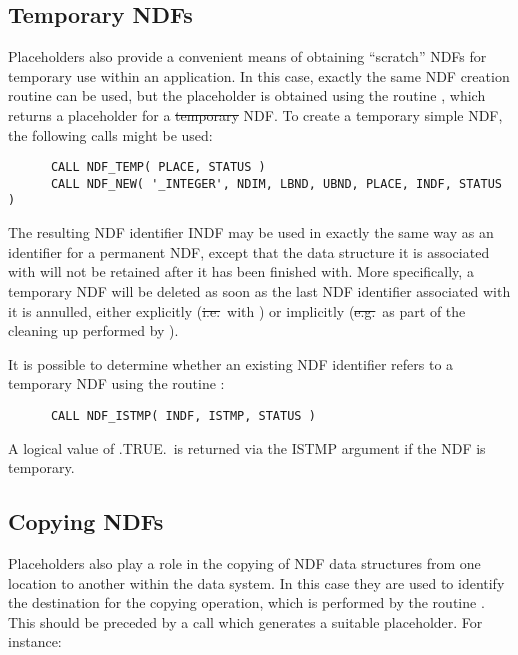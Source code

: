 \subsection{Temporary NDFs}

Placeholders also provide a convenient means of obtaining ``scratch'' NDFs
for temporary use within an application.
In this case, exactly the same NDF creation routine can be used, but the
placeholder is obtained using the routine , which returns a
placeholder for a \st{temporary\/} NDF. 
To create a temporary simple NDF, the following calls might be used:

\small
\begin{verbatim}
      CALL NDF_TEMP( PLACE, STATUS )
      CALL NDF_NEW( '_INTEGER', NDIM, LBND, UBND, PLACE, INDF, STATUS )
\end{verbatim}
\normalsize

The resulting NDF identifier INDF may be used in exactly the same way as an
identifier for a permanent NDF, except that the data structure it is
associated with will not be retained after it has been finished with. 
More specifically, a temporary NDF will be deleted as soon as the last NDF
identifier associated with it is annulled, either explicitly (\st{i.e.}\ with
) or implicitly (\st{e.g.}\ as part of the cleaning up performed by
). 

It is possible to determine whether an existing NDF identifier refers to a 
temporary NDF using the routine :

\small
\begin{verbatim}
      CALL NDF_ISTMP( INDF, ISTMP, STATUS )
\end{verbatim}
\normalsize

A logical value of .TRUE.\ is returned via the ISTMP argument if the NDF is 
temporary.

\subsection{Copying NDFs}

Placeholders also play a role in the copying of NDF data structures from one 
location to another within the data system.
In this case they are used to identify the destination for the copying 
operation, which is performed by the routine .
This should be preceded by a call which generates a suitable placeholder. 
For instance:

